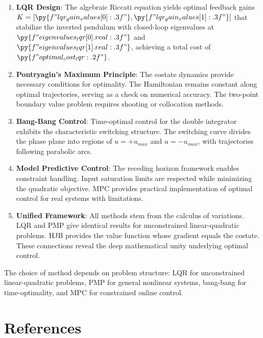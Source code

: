 \documentclass[a4paper, 11pt]{article}
\begin{document}
\begin{enumerate}
\item \textbf{LQR Design}: The algebraic Riccati equation yields optimal feedback gains
$K = [\py{f"{lqr_gain_values[0]:.3f}"}, \py{f"{lqr_gain_values[1]:.3f}"}]$ that stabilize
the inverted pendulum with closed-loop eigenvalues at $\py{f"{eigenvalues_lqr[0].real:.3f}"}$
and $\py{f"{eigenvalues_lqr[1].real:.3f}"}$, achieving a total cost of $\py{f"{optimal_cost_lqr:.2f}"}$.

\item \textbf{Pontryagin's Maximum Principle}: The costate dynamics provide necessary
conditions for optimality. The Hamiltonian remains constant along optimal trajectories,
serving as a check on numerical accuracy. The two-point boundary value problem requires
shooting or collocation methods.

\item \textbf{Bang-Bang Control}: Time-optimal control for the double integrator exhibits
the characteristic switching structure. The switching curve divides the phase plane into
regions of $u = +u_{max}$ and $u = -u_{max}$, with trajectories following parabolic arcs.

\item \textbf{Model Predictive Control}: The receding horizon framework enables constraint
handling. Input saturation limits are respected while minimizing the quadratic objective.
MPC provides practical implementation of optimal control for real systems with limitations.

\item \textbf{Unified Framework}: All methods stem from the calculus of variations. LQR
and PMP give identical results for unconstrained linear-quadratic problems. HJB provides
the value function whose gradient equals the costate. These connections reveal the deep
mathematical unity underlying optimal control.
\end{enumerate}

The choice of method depends on problem structure: LQR for unconstrained linear-quadratic
problems, PMP for general nonlinear systems, bang-bang for time-optimality, and MPC for
constrained online control.

\section*{References}
\end{document}
